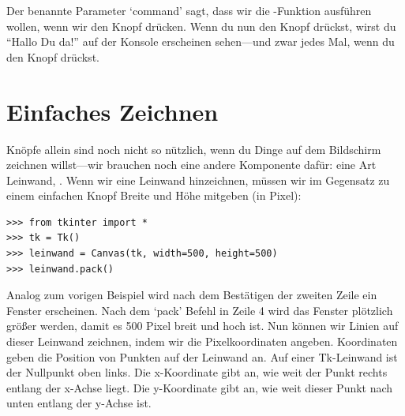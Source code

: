 Der benannte Parameter `command' sagt, dass wir die -Funktion ausführen wollen, wenn wir den Knopf drücken. Wenn du nun den Knopf drückst, wirst du ``Hallo Du da!'' auf der Konsole erscheinen sehen---und zwar jedes Mal, wenn du den Knopf drückst. 

\section{Einfaches Zeichnen}

Knöpfe allein sind noch nicht so nützlich, wenn du Dinge auf dem Bildschirm zeichnen willst---wir brauchen noch eine andere Komponente dafür: eine Art Leinwand, . Wenn wir eine Leinwand hinzeichnen, müssen wir im Gegensatz zu einem einfachen Knopf Breite und Höhe mitgeben (in Pixel):

\begin{Verbatim}[frame=single]
>>> from tkinter import *
>>> tk = Tk()
>>> leinwand = Canvas(tk, width=500, height=500)
>>> leinwand.pack()
\end{Verbatim}

Analog zum vorigen Beispiel wird nach dem Bestätigen der zweiten Zeile ein Fenster erscheinen. Nach dem `pack' Befehl in Zeile 4 wird das Fenster plötzlich größer werden, damit es 500 Pixel breit und hoch ist. Nun können wir Linien auf dieser Leinwand zeichnen, indem wir die Pixelkoordinaten angeben. Koordinaten geben die Position von Punkten auf der Leinwand an. Auf einer Tk-Leinwand ist der Nullpunkt oben links. Die x-Koordinate gibt an, wie weit der Punkt rechts entlang der x-Achse liegt. Die y-Koordinate gibt an, wie weit dieser Punkt nach unten entlang der y-Achse ist.

